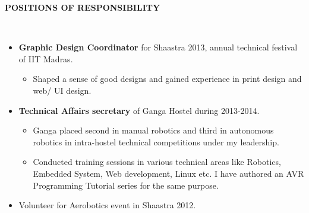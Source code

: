 \documentclass[a4paper,10pt]{article}
\newcommand{\lsep}{-0.5cm}
\newcommand{\resheading}[1]{{\small \colorbox{mygrey}{\begin{minipage}{0.975\textwidth}{\textbf{#1 \vphantom{p\^{E}}}}\end{minipage}}}}
\begin{document}
\resheading{\textbf{POSITIONS OF RESPONSIBILITY} }\\[\lsep]
    \begin{itemize}
        \item \textbf{Graphic Design Coordinator} for Shaastra 2013, annual technical festival of 
        IIT Madras.
        \vspace{-5pt}
        \begin{itemize}
            \item Shaped a sense of good designs and gained experience in print design and web/ UI design.\vspace{-5pt}
        \end{itemize}
        \item \textbf{Technical Affairs secretary} of Ganga Hostel during 2013-2014.
        \vspace{-5pt}
            \begin{itemize}
            \item  Ganga placed second in manual robotics and third in autonomous robotics in intra-hostel technical competitions under my leadership.
            \item Conducted training sessions in various technical areas like Robotics, Embedded System, Web development, Linux etc. I have authored an AVR Programming  Tutorial series for the same purpose.\vspace{-5pt}
            \end{itemize}
        \item Volunteer for Aerobotics event in Shaastra 2012.
    \end{itemize}
\end{document}

